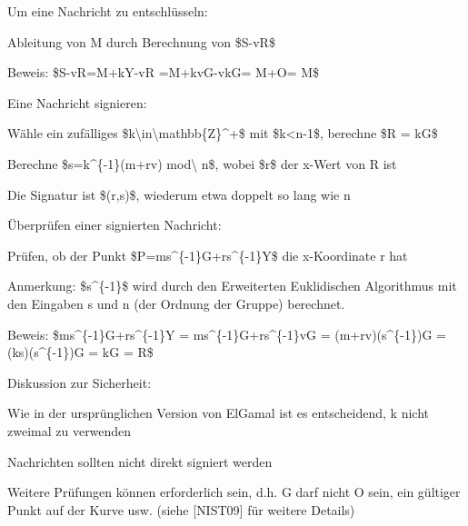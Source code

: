 \documentclass[a4paper]{article}
\begin{document}
\begin{multicols}{3}
\begin{itemize*}
            \item Um eine Nachricht zu entschlüsseln:
            \begin{itemize*}
                  \item Ableitung von M durch Berechnung von \$S-vR\$
                  \item Beweis: \$S-vR=M+kY-vR =M+kvG-vkG= M+O= M\$
            \end{itemize*}
            \item Eine Nachricht signieren:
            \begin{itemize*}
                  \item Wähle ein zufälliges \$k\textbackslash in\textbackslash mathbb\{Z\}\^{}+\$ mit \$k\textless n-1\$, berechne \$R = kG\$
                  \item Berechne \$s=k\^{}\{-1\}(m+rv) mod\textbackslash{} n\$, wobei \$r\$ der x-Wert von R ist
                  \item Die Signatur ist \$(r,s)\$, wiederum etwa doppelt so lang wie n
            \end{itemize*}
            \item Überprüfen einer signierten Nachricht:
            \begin{itemize*}
                  \item Prüfen, ob der Punkt \$P=ms\^{}\{-1\}G+rs\^{}\{-1\}Y\$ die x-Koordinate r hat
                  \item Anmerkung: \$s\^{}\{-1\}\$ wird durch den Erweiterten Euklidischen Algorithmus mit den Eingaben s und n (der Ordnung der Gruppe) berechnet.
                  \item Beweis: \$ms\^{}\{-1\}G+rs\^{}\{-1\}Y = ms\^{}\{-1\}G+rs\^{}\{-1\}vG = (m+rv)(s\^{}\{-1\})G = (ks)(s\^{}\{-1\})G = kG = R\$
            \end{itemize*}
            \item Diskussion zur Sicherheit:
            \begin{itemize*}
                  \item Wie in der ursprünglichen Version von ElGamal ist es entscheidend, k nicht zweimal zu verwenden
                  \item Nachrichten sollten nicht direkt signiert werden
                  \item Weitere Prüfungen können erforderlich sein, d.h. G darf nicht O sein, ein gültiger Punkt auf der Kurve usw. (siehe {[}NIST09{]} für weitere Details)
            \end{itemize*}
      \end{itemize*}



\end{multicols}
\end{document}

